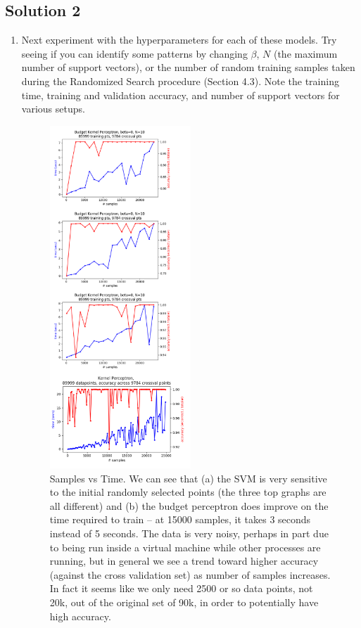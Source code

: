 \documentclass[submit]{harvardml}
\newenvironment{answer}{%
    \color{answergreen}\bf}
  {%
  }
\begin{document}
\subsection*{Solution 2}
\begin{enumerate}
\item Next experiment with the hyperparameters for each of these
  models. Try seeing if you can identify some patterns by changing
  $\beta$, $N$ (the maximum number of support vectors), or the number
  of random training samples taken during the Randomized Search
  procedure (Section 4.3).  Note the training time, training and
  validation accuracy, and number of support vectors for various
  setups.
  \begin{answer}

            \begin{figure}[H]
                \centering
                \includegraphics[width=0.5\textwidth]{samplesvstime.png}
                \caption{Samples vs Time. We can see that (a) the SVM is very sensitive to the
                initial randomly selected points (the three top graphs are all different) and (b)
            the budget perceptron does improve on the time required to train -- at 15000 samples, it
        takes 3 seconds instead of 5 seconds. The data is very noisy, perhaps in part due to being
    run inside a virtual machine while other processes are running, but in general we see a trend
toward higher accuracy (against the cross validation set) as number of samples increases. In fact it
seems like we only need 2500 or so data points, not 20k, out of the original set of 90k, in order to
potentially have high accuracy.}
                \label{Problem 1, part 1.}
            \end{figure}


\end{answer}
\end{enumerate}
\end{document}
